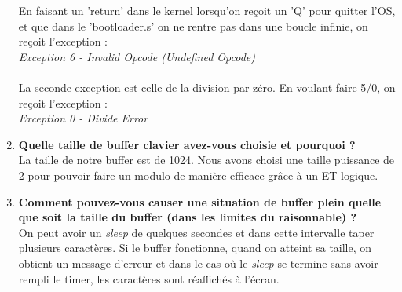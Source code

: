\documentclass[a4paper]{article}
\begin{document}
\begin{enumerate}
En faisant un 'return' dans le kernel lorsqu'on reçoit un 'Q' pour quitter l'OS, et que dans le 'bootloader.s' on ne rentre pas dans une boucle infinie, on reçoit l'exception : \\
\textit{Exception 6 - Invalid Opcode (Undefined Opcode)}\\\\
La seconde exception est celle de la division par zéro. En voulant faire 5/0, on reçoit l'exception :\\
\textit{Exception 0 - Divide Error}
\item \textbf{Quelle taille de buffer clavier avez-vous choisie et pourquoi ?}\\
La taille de notre buffer est de 1024. Nous avons choisi une taille puissance de 2 pour pouvoir faire un modulo de manière efficace grâce à un ET logique.
\item \textbf{Comment pouvez-vous causer une situation de buffer plein quelle que soit la taille du buffer (dans les limites du raisonnable) ?}\\
On peut avoir un \textit{sleep} de quelques secondes et dans cette intervalle taper plusieurs caractères. Si le buffer fonctionne, quand on atteint sa taille, on obtient un message d'erreur et dans le cas où le \textit{sleep} se termine sans avoir rempli le timer, les caractères sont réaffichés à l'écran.
\end{enumerate}
\end{document}
